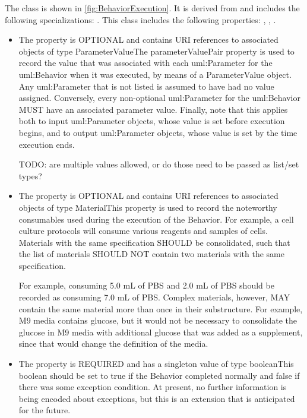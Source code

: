 %
The  class is shown in \ref{fig:BehaviorExecution}. It is derived from  and includes the following specializations: . %
This class includes the following properties: , , . %
\begin{itemize}%
\item%
The  property is OPTIONAL and contains URI references to associated objects of type ParameterValueThe parameterValuePair property is used to record the value that was associated with each
        uml:Parameter for the uml:Behavior when it was executed, by means of a ParameterValue object.
        Any uml:Parameter that is not listed is assumed to have had no value assigned. Conversely, every non-optional
        uml:Parameter for the uml:Behavior MUST have an associated parameter value.
        Finally, note that this applies both to input uml:Parameter objects, whose value is set before execution begins,
        and to output uml:Parameter objects, whose value is set by the time execution ends.

        TODO: are multiple values allowed, or do those need to be passed as list/set types?
\item%
The  property is OPTIONAL and contains URI references to associated objects of type MaterialThis property is used to record the noteworthy consumables used during the execution of the
        Behavior. For example, a cell culture protocols will consume various reagents and samples of cells. Materials
        with the same specification SHOULD be consolidated, such that the list of materials SHOULD NOT contain two
        materials with the same specification.

        For example, consuming 5.0 mL of PBS and 2.0 mL of PBS should be recorded as consuming 7.0 mL of PBS.
        Complex materials, however, MAY contain the same material more than once in their substructure.
        For example, M9 media contains glucose, but it would not be necessary to consolidate the glucose in M9 media
        with additional glucose that was added as a supplement, since that would change the definition of the media.%
\item%
The  property is REQUIRED and has a singleton value of type booleanThis boolean should be set to true if the Behavior completed normally and false if there
        was some exception condition. At present, no further information is being encoded about exceptions, but this
        is an extension that is anticipated for the future.%
\end{itemize}%
